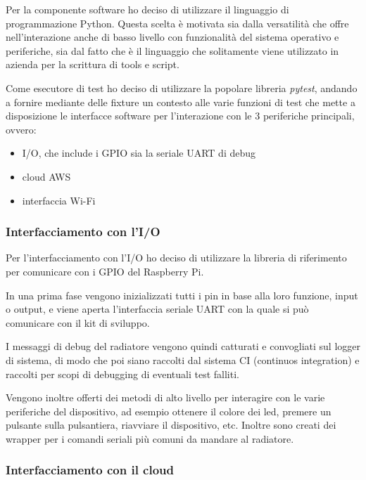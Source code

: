 \documentclass[a4paper,titlepage]{article}
\begin{document}
Per la componente software ho deciso di utilizzare il linguaggio di programmazione
Python. Questa scelta è motivata sia dalla versatilità che offre nell'interazione anche
di basso livello con funzionalità del sistema operativo e periferiche, sia dal fatto
che è il linguaggio che solitamente viene utilizzato in azienda per la scrittura di
tools e script.

Come esecutore di test ho deciso di utilizzare la popolare libreria \textit{pytest},
andando a fornire mediante delle fixture un contesto alle varie funzioni di test che
mette a disposizione le interfacce software per l'interazione con le 3 periferiche
principali, ovvero:

\begin{itemize}
    \item I/O, che include i GPIO sia la seriale UART di debug
    \item cloud AWS
    \item interfaccia Wi-Fi
\end{itemize}

\subsubsection{Interfacciamento con l'I/O}

Per l'interfacciamento con l'I/O ho deciso di utilizzare la libreria di riferimento
per comunicare con i GPIO del Raspberry Pi.

In una prima fase vengono inizializzati tutti i pin in base alla loro funzione, input
o output, e viene aperta l'interfaccia seriale UART con la quale si può comunicare con
il kit di sviluppo.

I messaggi di debug del radiatore vengono quindi catturati e convogliati sul logger
di sistema, di modo che poi siano raccolti dal sistema CI (continuos integration)
e raccolti per scopi di debugging di eventuali test falliti.

Vengono inoltre offerti dei metodi di alto livello per interagire con le varie
periferiche del dispositivo, ad esempio ottenere il colore dei led, premere un
pulsante sulla pulsantiera, riavviare il dispositivo, etc.
Inoltre sono creati dei wrapper per i comandi seriali più comuni da mandare al
radiatore.

\subsubsection{Interfacciamento con il cloud}
\end{document}
